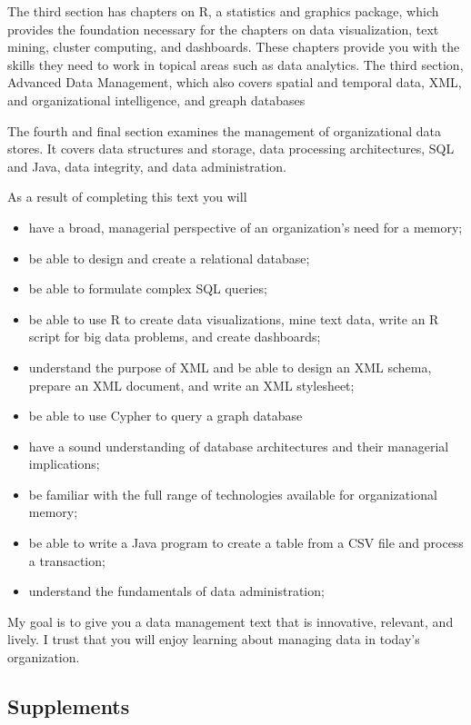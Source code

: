 \documentclass[
]{article}
\begin{document}
The third section has chapters on R, a statistics and graphics package,
which provides the foundation necessary for the chapters on data
visualization, text mining, cluster computing, and dashboards. These
chapters provide you with the skills they need to work in topical areas
such as data analytics. The third section, Advanced Data Management,
which also covers spatial and temporal data, XML, and organizational
intelligence, and greaph databases

The fourth and final section examines the management of organizational
data stores. It covers data structures and storage, data processing
architectures, SQL and Java, data integrity, and data administration.

As a result of completing this text you will

\begin{itemize}
\item
  have a broad, managerial perspective of an organization's need for a
  memory;
\item
  be able to design and create a relational database;
\item
  be able to formulate complex SQL queries;
\item
  be able to use R to create data visualizations, mine text data, write
  an R script for big data problems, and create dashboards;
\item
  understand the purpose of XML and be able to design an XML schema,
  prepare an XML document, and write an XML stylesheet;
\item
  be able to use Cypher to query a graph database
\item
  have a sound understanding of database architectures and their
  managerial implications;
\item
  be familiar with the full range of technologies available for
  organizational memory;
\item
  be able to write a Java program to create a table from a CSV file and
  process a transaction;
\item
  understand the fundamentals of data administration;
\end{itemize}

My goal is to give you a data management text that is innovative,
relevant, and lively. I trust that you will enjoy learning about
managing data in today's organization.

\hypertarget{supplements}{%
\subsection*{Supplements}\label{supplements}}
\end{document}
